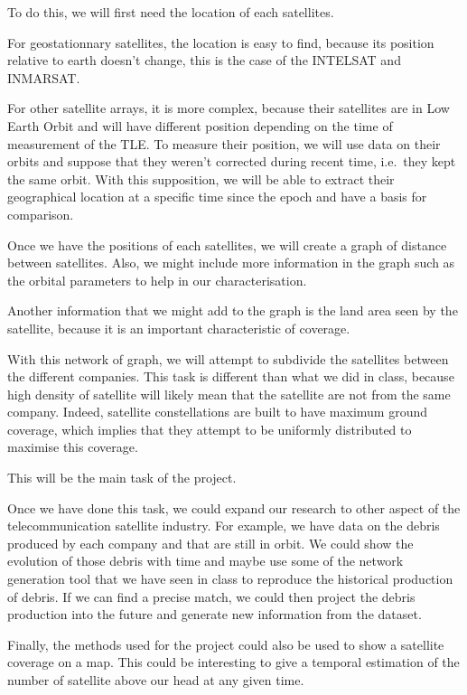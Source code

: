 \documentclass[11pt,letterpaper]{article}
\begin{document}
To do this, we will first need the location of each satellites.

For geostationnary satellites, the location is easy to find, because its position relative to earth doesn't change, this is the case of the INTELSAT and INMARSAT.

For other satellite arrays, it is more complex, because their satellites are in Low Earth Orbit and will have different position depending on the time of measurement of the TLE\@.
To measure their position, we will use data on their orbits and suppose that they weren't corrected during recent time, i.e.\ they kept the same orbit.
With this supposition, we will be able to extract their geographical location at a specific time since the epoch and have a basis for comparison.

Once we have the positions of each satellites, we will create a graph of distance between satellites. 
Also, we might include more information in the graph such as the orbital parameters to help in our characterisation.

Another information that we might add to the graph is the land area seen by the satellite, because it is an important characteristic of coverage.

With this network of graph, we will attempt to subdivide the satellites between the different companies.
This task is different than what we did in class, because high density of satellite will likely mean that the satellite are not from the same company.
Indeed, satellite constellations are built to have maximum ground coverage, which implies that they attempt to be uniformly distributed to maximise this coverage.

This will be the main task of the project.

Once we have done this task, we could expand our research to other aspect of the telecommunication satellite industry.
For example, we have data on the debris produced by each company and that are still in orbit.
We could show the evolution of those debris with time and maybe use some of the network generation tool that we have seen in class to reproduce the historical production of debris.
If we can find a precise match, we could then project the debris production into the future and generate new information from the dataset.

Finally, the methods used for the project could also be used to show a satellite coverage on a map. 
This could be interesting to give a temporal estimation of the number of satellite above our head at any given time.
\end{document}

